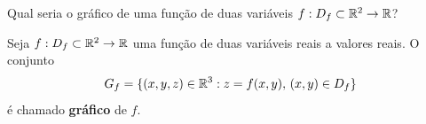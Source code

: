 
Qual seria o gráfico de uma função de duas variáveis \(f: D_f \subset\mathbb{R}^2 \to \mathbb{R}\)?

\begin{definition}
    Seja \(f:D_f\subset\mathbb{R}^2 \to \mathbb{R}\) uma função de duas variáveis reais a valores reais. O conjunto \[G_f = \{(x,y,z)\in\mathbb{R}^3 : z = f(x,y),\, (x,y)\in D_f\}\] é chamado \textbf{gráfico} de \(f\).
\end{definition}

